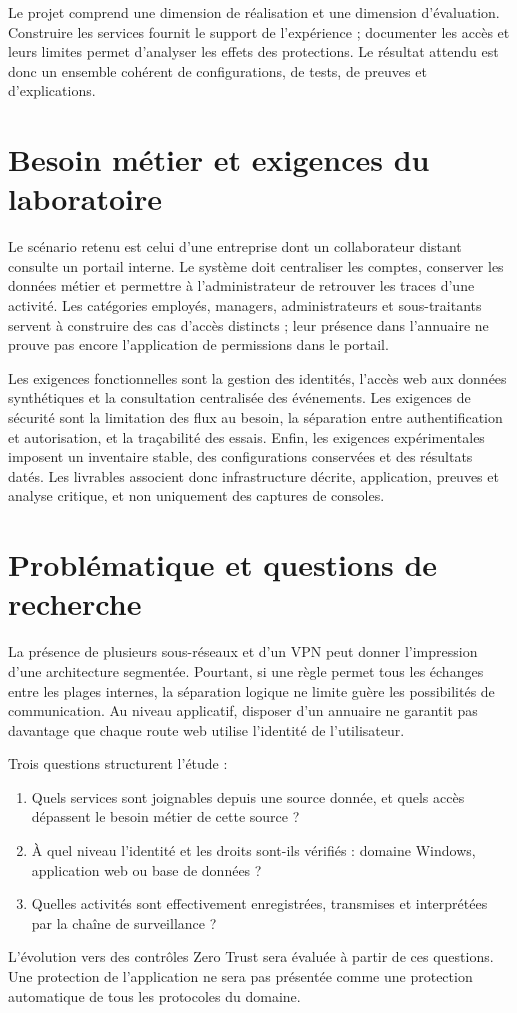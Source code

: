 \documentclass[a4paper,12pt]{report}
\begin{document}
Le projet comprend une dimension de réalisation et une dimension d'évaluation. Construire les services fournit le support de l'expérience ; documenter les accès et leurs limites permet d'analyser les effets des protections. Le résultat attendu est donc un ensemble cohérent de configurations, de tests, de preuves et d'explications.

\section{Besoin métier et exigences du laboratoire}
Le scénario retenu est celui d'une entreprise dont un collaborateur distant consulte un portail interne. Le système doit centraliser les comptes, conserver les données métier et permettre à l'administrateur de retrouver les traces d'une activité. Les catégories employés, managers, administrateurs et sous-traitants servent à construire des cas d'accès distincts ; leur présence dans l'annuaire ne prouve pas encore l'application de permissions dans le portail.

Les exigences fonctionnelles sont la gestion des identités, l'accès web aux données synthétiques et la consultation centralisée des événements. Les exigences de sécurité sont la limitation des flux au besoin, la séparation entre authentification et autorisation, et la traçabilité des essais. Enfin, les exigences expérimentales imposent un inventaire stable, des configurations conservées et des résultats datés. Les livrables associent donc infrastructure décrite, application, preuves et analyse critique, et non uniquement des captures de consoles.

\section{Problématique et questions de recherche}
La présence de plusieurs sous-réseaux et d'un VPN peut donner l'impression d'une architecture segmentée. Pourtant, si une règle permet tous les échanges entre les plages internes, la séparation logique ne limite guère les possibilités de communication. Au niveau applicatif, disposer d'un annuaire ne garantit pas davantage que chaque route web utilise l'identité de l'utilisateur.

Trois questions structurent l'étude :
\begin{enumerate}
\item Quels services sont joignables depuis une source donnée, et quels accès dépassent le besoin métier de cette source ?
\item À quel niveau l'identité et les droits sont-ils vérifiés : domaine Windows, application web ou base de données ?
\item Quelles activités sont effectivement enregistrées, transmises et interprétées par la chaîne de surveillance ?
\end{enumerate}
L'évolution vers des contrôles Zero Trust sera évaluée à partir de ces questions. Une protection de l'application ne sera pas présentée comme une protection automatique de tous les protocoles du domaine.
\end{document}
